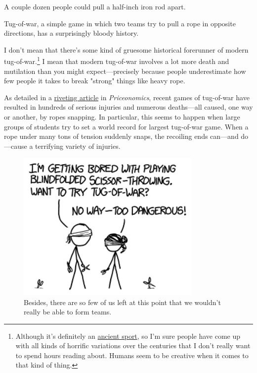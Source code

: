 {\hfill{}

{A couple dozen people could pull a half-inch iron rod apart.}

{Tug-of-war, a simple game in which two teams try to pull a rope in opposite directions, has a surprisingly bloody history.}

{I don't mean that there's some kind of gruesome historical forerunner of modern tug-of-war.{\footnote{Although it's definitely an \href{http://www.usatowa.com/history.html}{ancient sport}, so I'm sure people have come up with all kinds of horrific variations over the centuries that I don't really want to spend hours reading about. Humans seem to be creative when it comes to that kind of thing.} } I mean that modern tug-of-war involves a lot more death and mutilation than you might expect—precisely because people underestimate how few people it takes to break "strong" things like heavy rope.}

{As detailed in a \href{http://priceonomics.com/a-history-of-tug-of-war-fatalities/}{riveting article} in \emph{Priceonomics}, recent games of tug-of-war have resulted in hundreds of serious injuries and numerous deaths—all caused, one way or another, by ropes snapping. In particular, this seems to happen when large groups of students try to set a world record for largest tug-of-war game. When a rope under many tons of tension suddenly snaps, the recoiling ends can—and do—cause a terrifying variety of injuries.}

\begin{figure}[!htbp]
\centering
\includegraphics[scale=0.5, max width=0.8\textwidth]{imgs/a/127/dangerous.png}
\caption{Besides, there are so few of us left at this point that we wouldn't really be able to form teams.}
\end{figure}

}

